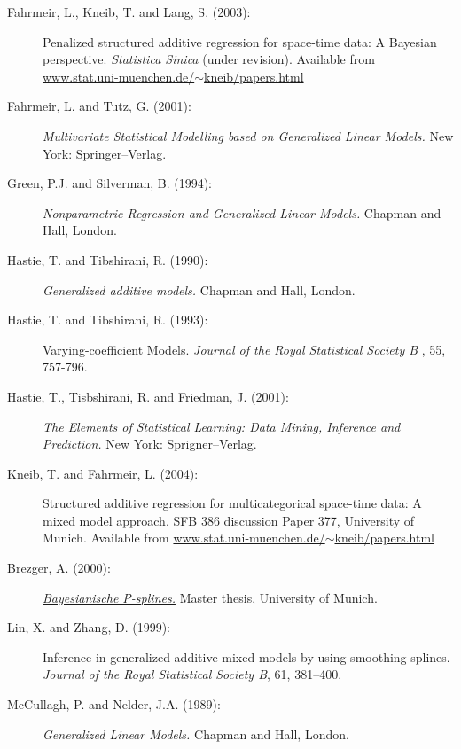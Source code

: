 \begin{description}

\item[Fahrmeir, L., Kneib, T. and Lang, S. (2003):] Penalized
structured additive regression for space-time data: A Bayesian
perspective. {\it Statistica Sinica} (under revision). Available
from
\href{http://www.stat.uni-muenchen.de/~kneib/papers.html}{www.stat.uni-muenchen.de/$\sim$kneib/papers.html}

\item[Fahrmeir, L. and Tutz, G. (2001):] {\em Multivariate
Statistical Modelling based on Generalized Linear Models.} New
York: Springer--Verlag.

\item[Green, P.J. and Silverman, B. (1994):] {\em Nonparametric Regression and Generalized Linear Models.} Chapman
and Hall, London.

\item[Hastie, T. and Tibshirani, R. (1990):] {\em Generalized additive models.} Chapman and
Hall, London.

\item[Hastie, T. and Tibshirani, R. (1993):] Varying-coefficient Models.
{\em Journal of the Royal Statistical Society B} , 55, 757-796.

\item[Hastie, T., Tisbshirani, R. and Friedman, J. (2001):] {\em The Elements of Statistical Learning: Data Mining,
Inference and Prediction.} New York: Sprigner--Verlag.

\item[Kneib, T. and Fahrmeir, L. (2004):] Structured additive
regression for multicategorical space-time data: A mixed model
approach. SFB 386 discussion Paper 377, University of Munich.
Available from
\href{http://www.stat.uni-muenchen.de/~kneib/papers.html}{www.stat.uni-muenchen.de/$\sim$kneib/papers.html}

\item[Brezger, A. (2000):]
\href{http://www.stat.uni-muenchen.de/~andib} {\em Bayesianische
P-splines.} Master thesis, University of Munich.

\item[Lin, X. and Zhang, D. (1999):] Inference in generalized additive mixed models by using
smoothing splines. {\it Journal of the Royal Statistical Society
B}, 61, 381--400.

\item[McCullagh, P. and Nelder, J.A. (1989):] {\em Generalized Linear Models.} Chapman and Hall, London.

\end{description}
